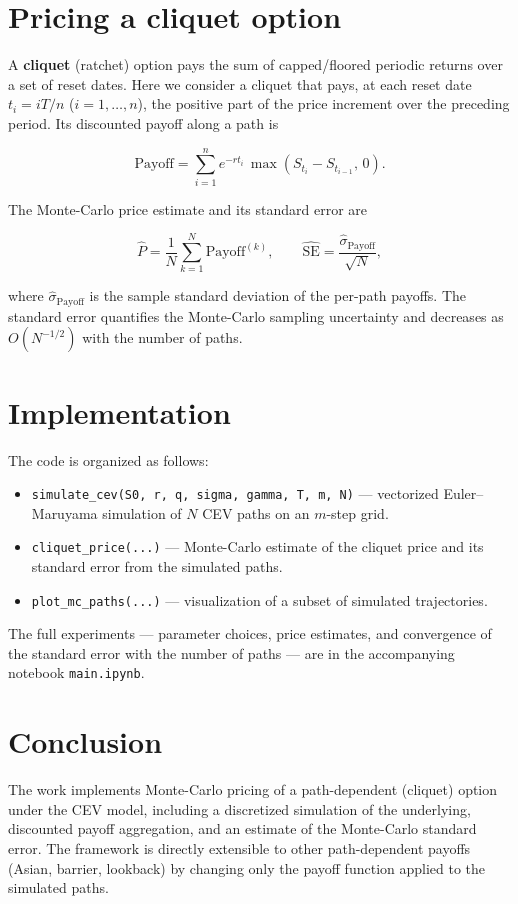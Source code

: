 \documentclass[]{article}
\begin{document}
\section{Pricing a cliquet option}

A \textbf{cliquet} (ratchet) option pays the sum of capped/floored periodic returns over a set of
reset dates. Here we consider a cliquet that pays, at each reset date $t_i = iT/n$ ($i = 1, \dots, n$),
the positive part of the price increment over the preceding period. Its discounted payoff along a
path is

\begin{equation}
	\text{Payoff} = \sum_{i=1}^{n} e^{-r t_i}\,\max\!\left(S_{t_i} - S_{t_{i-1}},\, 0\right).
\end{equation}

The Monte-Carlo price estimate and its standard error are

\begin{equation}
	\hat{P} = \frac{1}{N}\sum_{k=1}^{N} \text{Payoff}^{(k)},
	\qquad
	\widehat{\text{SE}} = \frac{\hat{\sigma}_{\text{Payoff}}}{\sqrt{N}},
\end{equation}

where $\hat{\sigma}_{\text{Payoff}}$ is the sample standard deviation of the per-path payoffs. The
standard error quantifies the Monte-Carlo sampling uncertainty and decreases as $O(N^{-1/2})$ with
the number of paths.

\section{Implementation}

The code is organized as follows:

\begin{itemize}
	\item \texttt{simulate\_cev(S0, r, q, sigma, gamma, T, m, N)} --- vectorized Euler--Maruyama
	simulation of $N$ CEV paths on an $m$-step grid.
	\item \texttt{cliquet\_price(...)} --- Monte-Carlo estimate of the cliquet price and its standard
	error from the simulated paths.
	\item \texttt{plot\_mc\_paths(...)} --- visualization of a subset of simulated trajectories.
\end{itemize}

The full experiments --- parameter choices, price estimates, and convergence of the standard error
with the number of paths --- are in the accompanying notebook \texttt{main.ipynb}.

\section{Conclusion}

The work implements Monte-Carlo pricing of a path-dependent (cliquet) option under the CEV model,
including a discretized simulation of the underlying, discounted payoff aggregation, and an estimate
of the Monte-Carlo standard error. The framework is directly extensible to other path-dependent
payoffs (Asian, barrier, lookback) by changing only the payoff function applied to the simulated paths.
\end{document}
